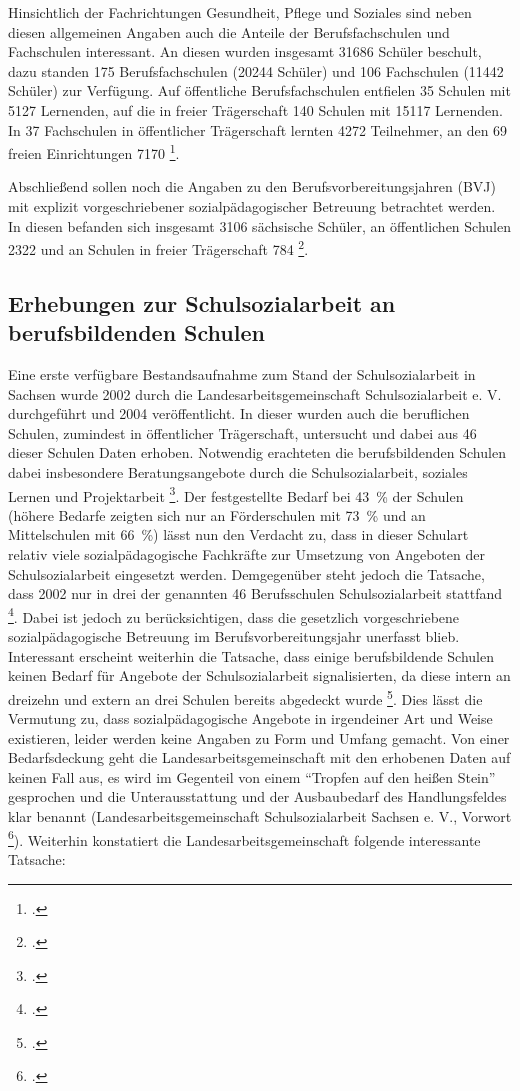 Hinsichtlich der Fachrichtungen Gesundheit, Pflege und Soziales sind neben diesen allgemeinen Angaben auch die Anteile der Berufsfachschulen und Fachschulen interessant. An diesen wurden insgesamt 31686 Schüler beschult, dazu standen 175 Berufsfachschulen (20244 Schüler) und 106 Fachschulen (11442 Schüler) zur Verfügung. Auf öffentliche Berufsfachschulen entfielen 35 Schulen mit 5127 Lernenden, auf die in freier Trägerschaft 140 Schulen mit 15117 Lernenden. In 37 Fachschulen in öffentlicher Trägerschaft lernten 4272 Teilnehmer, an den 69 freien Einrichtungen 7170 \footcite[vgl.][286ff]{SLFS2015}. 

Abschließend sollen noch die Angaben zu den Berufsvorbereitungsjahren (BVJ) mit explizit vorgeschriebener sozialpädagogischer Betreuung betrachtet werden. In diesen befanden sich insgesamt 3106 sächsische Schüler, an öffentlichen Schulen 2322 und an Schulen in freier Trägerschaft 784 \footcite[vgl.][286ff]{SLFS2015}. 

\subsection{Erhebungen zur Schulsozialarbeit an berufsbildenden Schulen}
\label{sec:ErhebungenZurSchulsozialarbeitAnBerufsbildendenSchulen}

Eine erste verfügbare Bestandsaufnahme zum Stand der Schulsozialarbeit in Sachsen wurde 2002 durch die Landesarbeitsgemeinschaft Schulsozialarbeit e. V. durchgeführt und 2004 veröffentlicht. In dieser wurden auch die beruflichen Schulen, zumindest in öffentlicher Trägerschaft, untersucht und dabei aus 46 dieser Schulen Daten erhoben. Notwendig erachteten die berufsbildenden Schulen dabei insbesondere Beratungsangebote durch die Schulsozialarbeit, soziales Lernen und Projektarbeit \footcite[vgl.][6ff]{LSS2004}. Der festgestellte Bedarf bei \mbox{43 \%} der Schulen (höhere Bedarfe zeigten sich nur an Förderschulen mit \mbox{73 \%} und an Mittelschulen mit \mbox{66 \%}) lässt nun den Verdacht zu, dass in dieser Schulart relativ viele sozialpädagogische Fachkräfte zur Umsetzung von Angeboten der Schulsozialarbeit eingesetzt werden. Demgegenüber steht jedoch die Tatsache, dass 2002 nur in drei der genannten 46 Berufsschulen Schulsozialarbeit stattfand \footcite[vgl.][6ff]{LSS2004}. Dabei ist jedoch zu berücksichtigen, dass die gesetzlich vorgeschriebene sozialpädagogische Betreuung im Berufsvorbereitungsjahr unerfasst blieb. Interessant erscheint weiterhin die Tatsache, dass einige berufsbildende Schulen keinen Bedarf für Angebote der Schulsozialarbeit signalisierten, da diese intern an dreizehn und extern an drei Schulen bereits abgedeckt wurde \footcite[vgl.][5]{LSS2004}. Dies lässt die Vermutung zu, dass sozialpädagogische Angebote in irgendeiner Art und Weise existieren, leider werden keine Angaben zu Form und Umfang gemacht. Von einer Bedarfsdeckung geht die Landesarbeitsgemeinschaft mit den erhobenen Daten auf keinen Fall aus, es wird im Gegenteil von einem "`Tropfen auf den heißen Stein"' gesprochen und die Unterausstattung und der Ausbaubedarf des Handlungsfeldes klar benannt (Landesarbeitsgemeinschaft Schulsozialarbeit Sachsen e. V., Vorwort \footcite[vgl.]{LSS2004}). Weiterhin konstatiert die Landesarbeitsgemeinschaft folgende interessante Tatsache: 

